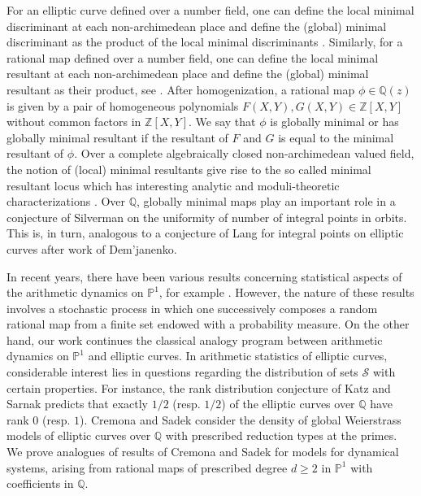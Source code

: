 \documentclass[12pt]{amsart}
\newcommand{\Z}{\mathbb{Z}}
\newcommand{\Q}{\mathbb{Q}}
\newcommand{\cS}{\mathcal{S}}
\numberwithin{equation}{section}
\begin{document}
For an elliptic curve defined over a number field, one can define the local minimal discriminant at each non-archimedean place and define the (global) minimal discriminant as the product of the local minimal discriminants \cite[Chapters~VII--VIII]{silvermanEC}. Similarly, for a rational map defined over a number field, one can define the local minimal resultant at each non-archimedean place and define the (global) minimal resultant as their product, see \cite[Chapter~4.11]{silvermantextbook}. After homogenization, a rational map $\phi\in\Q(z)$  is given by a pair of homogeneous 
polynomials $F(X,Y),G(X,Y)\in \Z[X,Y]$ without common factors in $\Z[X,Y]$. We say that $\phi$ is globally minimal or has globally minimal resultant if the resultant of $F$ and $G$ is equal to the minimal resultant of $\phi$. Over a complete algebraically closed non-archimedean valued field, the notion of (local) minimal resultants give rise to the so called minimal resultant locus which has interesting analytic and moduli-theoretic characterizations \cite{Rumely2015,Rumely2017}.  Over $\Q$, globally minimal maps play an important role in a conjecture of Silverman \cite[Conjecture 3.47]{silvermantextbook} on the uniformity of number of integral points in orbits. This is, in turn, analogous to a conjecture of Lang \cite{Lang} for integral points on elliptic curves after work of Dem'janenko.




In recent years, there have been various results concerning  statistical aspects of the arithmetic dynamics on $\mathbb{P}^1$, for example \cite{HH2019,H2021a,H2021b,DHHJ2024}. However, the nature of these results involves a stochastic process in which one successively composes a random rational map from a finite set endowed with a probability measure. On the other hand, our work continues the classical analogy program between arithmetic dynamics on $\mathbb{P}^1$ and elliptic curves. 
In arithmetic statistics of elliptic curves, considerable interest lies in questions regarding the distribution of sets $\cS$ with certain properties. For instance, the rank distribution conjecture of Katz and Sarnak predicts that exactly $1/2$ (resp. $1/2$) of the elliptic curves over $\Q$ have rank $0$ (resp. $1$). Cremona and Sadek \cite{cremonasadek} consider the density of global Weierstrass models of elliptic curves over $\Q$ with prescribed reduction types at the primes. We prove analogues of results of Cremona and Sadek for models for dynamical systems, arising from rational maps of prescribed degree $d\geq 2$ in $\mathbb{P}^1$ with coefficients in $\Q$.
\end{document}
